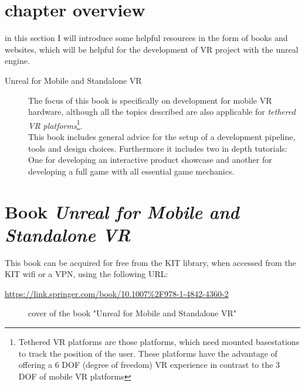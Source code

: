 \section{chapter overview}

in this section I will introduce some helpful resources in the form of books and websites, which will be helpful for the development of VR project with the unreal engine.


\begin{description}
\item[Unreal for Mobile and Standalone VR \cite{MobileVR}] The focus of this book is specifically on development for mobile VR hardware, although all the topics described are also applicable for \textit{tethered VR platforms}\footnote{Tethered VR platforms are those platforms, which need mounted basestations to track the position of the user. These platforms have the advantage of offering a 6 DOF (degree of freedom) VR experience in contrast to the 3 DOF of mobile VR  platforms}.\\
This book includes general advice for the setup of a development pipeline, tools and design choices. Furthermore it includes two in depth tutorials: One for developing an interactive product showcase and another for developing a full game with all essential game mechanics.
\end{description}

\section{Book \textit{Unreal for Mobile and Standalone VR}}

This book can be acquired for free from the KIT library\cite{KitBib}, when accessed from the KIT wifi or a VPN, using the following URL:

\url{https://link.springer.com/book/10.1007%2F978-1-4842-4360-2}

\setlength{\fboxsep}{0pt}
\setlength{\fboxrule}{0pt}
\begin{figure}[h]
\centering
{}
\caption[Unreal for Mobile and Standalone VR]{cover of the book "Unreal for Mobile and Standalone VR"}
\label{fig:unrealmobilecover}
\end{figure}

